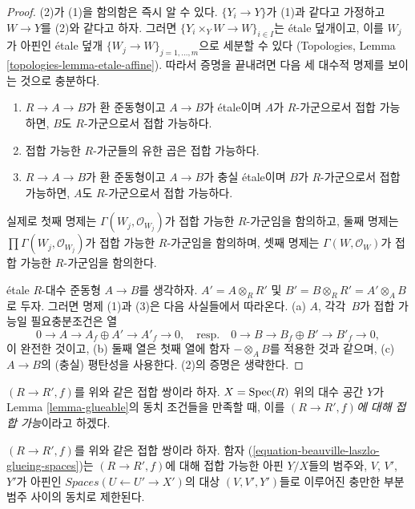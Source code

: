 \begin{proof}
(2)가 (1)을 함의함은 즉시 알 수 있다. $\{Y_i \to Y\}$가 (1)과
같다고 가정하고 $W \to Y$를 (2)와 같다고 하자. 그러면
$\{Y_i \times_Y W \to W\}_{i \in I}$는 \'etale 덮개이고,
이를 $W_j$가 아핀인 \'etale 덮개
$\{W_j \to W\}_{j = 1, \ldots, m}$으로 세분할 수 있다
(Topologies, Lemma \ref{topologies-lemma-etale-affine}). 따라서 증명을
끝내려면 다음 세 대수적 명제를 보이는 것으로 충분하다.
\begin{enumerate}
\item $R \to A \to B$가 환 준동형이고 $A \to B$가 \'etale이며
$A$가 $R$-가군으로서 접합 가능하면, $B$도 $R$-가군으로서 접합 가능하다.
\item 접합 가능한 $R$-가군들의 유한 곱은 접합 가능하다.
\item $R \to A \to B$가 환 준동형이고 $A \to B$가 충실 \'etale이며
$B$가 $R$-가군으로서 접합 가능하면, $A$도 $R$-가군으로서 접합 가능하다.
\end{enumerate}
실제로 첫째 명제는 $\Gamma(W_j, \mathcal{O}_{W_j})$가 접합 가능한
$R$-가군임을 함의하고, 둘째 명제는
$\prod \Gamma(W_j, \mathcal{O}_{W_j})$가 접합 가능한 $R$-가군임을
함의하며, 셋째 명제는 $\Gamma(W, \mathcal{O}_W)$가 접합 가능한
$R$-가군임을 함의한다.

\medskip\noindent
\'etale $R$-대수 준동형 $A \to B$를 생각하자.
$A' = A \otimes_R R'$ 및
$B' = B \otimes_R R' = A' \otimes_A B$로 두자. 그러면 명제 (1)과
(3)은 다음 사실들에서 따라온다. (a) $A$, 각각\ $B$가 접합 가능일
필요충분조건은 열
$$
0 \to A \to A_f \oplus A' \to A'_f \to 0,
\quad\text{resp.}\quad
0 \to B \to B_f \oplus B' \to B'_f \to 0,
$$
이 완전한 것이고, (b) 둘째 열은 첫째 열에 함자
$- \otimes_A B$를 적용한 것과 같으며, (c) $A \to B$의
(충실) 평탄성을 사용한다. (2)의 증명은 생략한다.
\end{proof}

\noindent
$(R \to R', f)$를 위와 같은 접합 쌍이라 하자.
$X = \mathop{\mathrm{Spec}}(R)$ 위의 대수 공간 $Y$가 Lemma
\ref{lemma-glueable}의 동치 조건들을 만족할 때, 이를
{\it $(R \to R', f)$에 대해 접합 가능}이라고 하겠다.

\begin{lemma}
\label{lemma-glueing-affines}
$(R \to R', f)$를 위와 같은 접합 쌍이라 하자. 함자
(\ref{equation-beauville-laszlo-glueing-spaces})는
$(R \to R', f)$에 대해 접합 가능한 아핀 $Y/X$들의 범주와,
$V$, $V'$, $Y'$가 아핀인 $\textit{Spaces}(U \leftarrow U' \to X')$의
대상 $(V, V', Y')$들로 이루어진 충만한 부분범주 사이의 동치로 제한된다.
\end{lemma}

